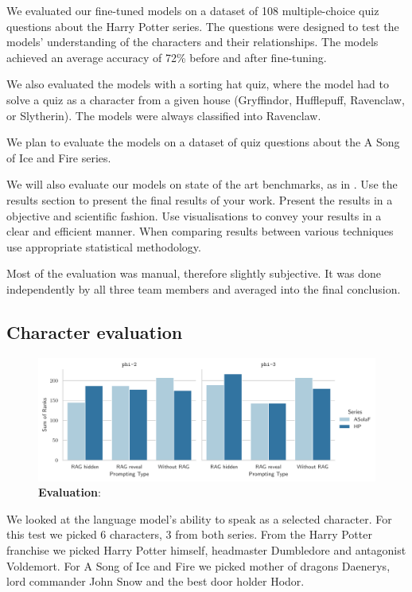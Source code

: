 \documentclass[fleqn,moreauthors,10pt]{ds_report}
\begin{document}
We evaluated our fine-tuned models on a dataset of 108 multiple-choice quiz questions about the Harry Potter series.
The questions were designed to test the models' understanding of the characters and their relationships.
The models achieved an average accuracy of 72\% before and after fine-tuning.

We also evaluated the models with a sorting hat quiz, where the model had to solve a quiz as a character from a given house (Gryffindor, Hufflepuff, Ravenclaw, or Slytherin).
The models were always classified into Ravenclaw.

We plan to evaluate the models on a dataset of quiz questions about the A Song of Ice and Fire series.

We will also evaluate our models on state of the art benchmarks, as in \cite{guo2023evaluating}.
Use the results section to present the final results of your work. Present the results in a objective and scientific fashion. Use visualisations to convey your results in a clear and efficient manner. When comparing results between various techniques use appropriate statistical methodology.

Most of the evaluation was manual, therefore slightly subjective.
It was done independently by all three team members and averaged into the final conclusion.

\subsection*{Character evaluation}

\begin{figure}[hbt]
	\centering
	\includegraphics[width=0.8\linewidth]{questioners-results.pdf}
	\caption{\textbf{Evaluation}: }
	\label{fig:dialogue_extract}
\end{figure}


We looked at the language model's ability to speak as a selected character.
For this test we picked 6 characters, 3 from both series.
From the Harry Potter franchise we picked Harry Potter himself, headmaster Dumbledore and antagonist Voldemort.
For A Song of Ice and Fire we picked mother of dragons Daenerys, lord commander John Snow and the best door holder Hodor.
\end{document}
